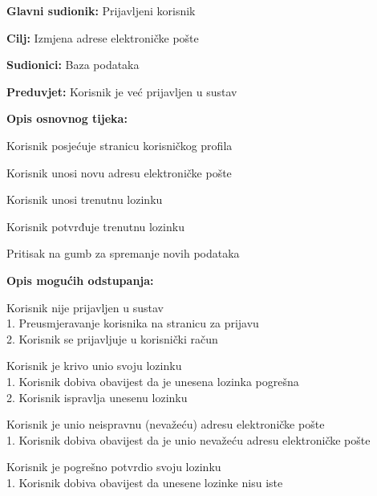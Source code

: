 					\noindent {}
					\begin{packed_item}
						\item \textbf{Glavni sudionik:} Prijavljeni korisnik
						\item \textbf{Cilj:} Izmjena adrese elektroničke pošte
						\item \textbf{Sudionici:} Baza podataka
						\item \textbf{Preduvjet:} Korisnik je već prijavljen u sustav
						\item \textbf{Opis osnovnog tijeka:}
						\begin{packed_enum}
							\item Korisnik posjećuje stranicu korisničkog profila
							\item Korisnik unosi novu adresu elektroničke pošte
							\item Korisnik unosi trenutnu lozinku
							\item Korisnik potvrđuje trenutnu lozinku
							\item Pritisak na gumb za spremanje novih podataka
						\end{packed_enum}
						\item \textbf{Opis mogućih odstupanja:}
						\begin{packed_item}
							\item [1.a] Korisnik nije prijavljen u sustav
							\\1. Preusmjeravanje korisnika na stranicu za prijavu
							\\2. Korisnik se prijavljuje u korisnički račun
							\item [2.a] Korisnik je krivo unio svoju lozinku
							\\1. Korisnik dobiva obavijest da je unesena lozinka pogrešna
							\\2. Korisnik ispravlja unesenu lozinku
							\item [3.a] Korisnik je unio neispravnu (nevažeću) adresu elektroničke pošte
							\\1. Korisnik dobiva obavijest da je unio nevažeću adresu elektroničke pošte
							\item [4.a] Korisnik je pogrešno potvrdio svoju lozinku
							\\1. Korisnik dobiva obavijest da unesene lozinke nisu iste
						\end{packed_item}
					\end{packed_item}

